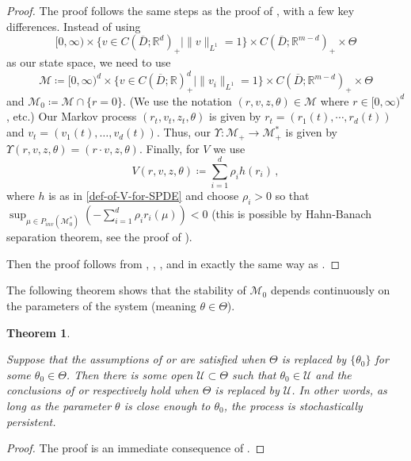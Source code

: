 \documentclass[final]{amsart}
\newtheorem{thm}{Theorem}
\numberwithin{thm}{section}
\numberwithin{equation}{section}
\newcommand{\U}{\mathcal{U}}
\newcommand{\mcM}{\mathcal{M}}
\newcommand{\R}{\mathbb{R}}
\newcommand{\inv}{\mathcal{M}_+}
\begin{document}
\begin{proof}
    The proof follows the same steps as the proof of , with a few key differences. Instead of using
    $$[0,\infty) \times \{v \in C(\overline D;\R^d)_+ \mid \|v\|_{L^1} = 1\} \times C(\overline D;\R^{m-d})_+ \times \Theta$$
    as our state space, we need to use
     $$\mcM \coloneqq [0,\infty)^d \times \{v \in C(\overline D;\R)_+^d \mid \|v_i\|_{L^1} = 1\} \times C(\overline D;\R^{m-d})_+ \times \Theta$$
     and $\mcM_0 \coloneqq \mcM \cap \{r = 0\}$. (We use the notation $(r,v,z,\theta) \in \mcM$ where $r \in [0,\infty)^d$, etc.)
     Our Markov process $(r_t,v_t,z_t,\theta)$ is given by $r_t = (r_1(t),\cdots,r_d(t))$ and $v_t = (v_1(t),\dots,v_d(t))$. Thus, our $\Upsilon: \inv \to \inv^*$ is given by $\Upsilon(r,v,z,\theta) = (r\cdot v,z,\theta)$.
     Finally, for $V$ we use
     $$V(r,v,z,\theta) \coloneqq \sum_{i=1}^d \rho_ih(r_i) \,,$$
     where $h$ is as in \eqref{def-of-V-for-SPDE} and choose $\rho_i > 0$  so that $\sup_{\mu \in P_{inv}(\mcM_0^*)} (-\sum_{i=1}^d \rho_ir_i(\mu)) < 0$ (this is possible by Hahn-Banach separation theorem, see the proof of ).

     Then the proof follows from , , , and  in exactly the same way as .
\end{proof}


The following theorem shows that the stability of $\mcM_0$ depends continuously on the parameters of the system (meaning $\theta \in \Theta$).

\begin{thm}
\label{robust-SPDE-thm}
    
    Suppose that the assumptions of  or  are satisfied when $\Theta$ is replaced by $\{\theta_0\}$ for some $\theta_0 \in \Theta$. Then there is some open $\U \subset \Theta$ such that $\theta_0 \in \U$ and the conclusions of  or  respectively hold when $\Theta$ is replaced by $\U$. In other words, as long as the parameter $\theta$ is close enough to $\theta_0$, the process is stochastically persistent.
\end{thm}

\begin{proof}
    The proof is an immediate consequence of .
    
\end{proof}
\end{document}
